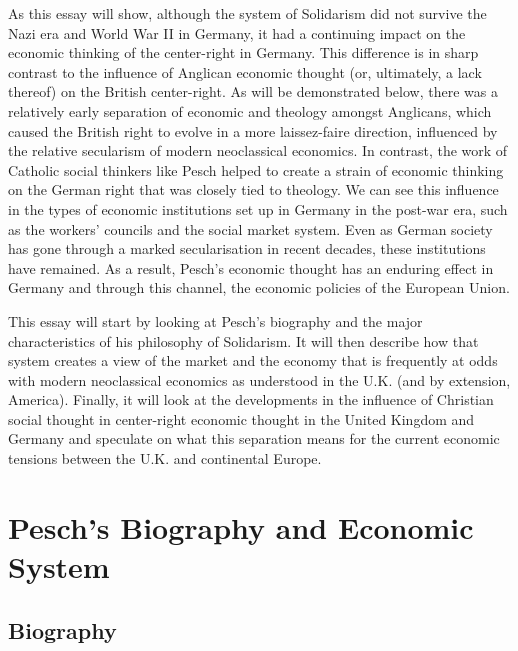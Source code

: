 \documentclass{article}
\begin{document}
As this essay will show, although the system of Solidarism did not survive the Nazi era and World War II in Germany, it had a continuing impact on the economic thinking of the center-right in Germany.  This difference is in sharp contrast to the influence of Anglican economic thought (or, ultimately, a lack thereof) on the British center-right.  As will be demonstrated below, there was a relatively early separation of economic and theology amongst Anglicans, which caused the British right to evolve in a more laissez-faire direction, influenced by the relative secularism of modern neoclassical economics.  In contrast, the work of Catholic social thinkers like Pesch helped to create a strain of economic thinking on the German right that was closely tied to theology.  We can see this influence in the types of economic institutions set up in Germany in the post-war era, such as the workers’ councils and the social market system.  Even as German society has gone through a marked secularisation in recent decades, these institutions have remained.  As a result, Pesch’s economic thought has an enduring effect in Germany and through this channel, the economic policies of the European Union.\medskip

This essay will start by looking at Pesch’s biography and the major characteristics of his philosophy of Solidarism.  It will then describe how that system creates a view of the market and the economy that is frequently at odds with modern neoclassical economics as understood in the U.K. (and by extension, America).  Finally, it will look at the developments in the influence of Christian social thought in center-right economic thought in the United Kingdom and Germany and speculate on what this separation means for the current economic tensions between the U.K. and continental Europe.

\section{Pesch's Biography and Economic System}

\subsection{Biography}
\end{document}
